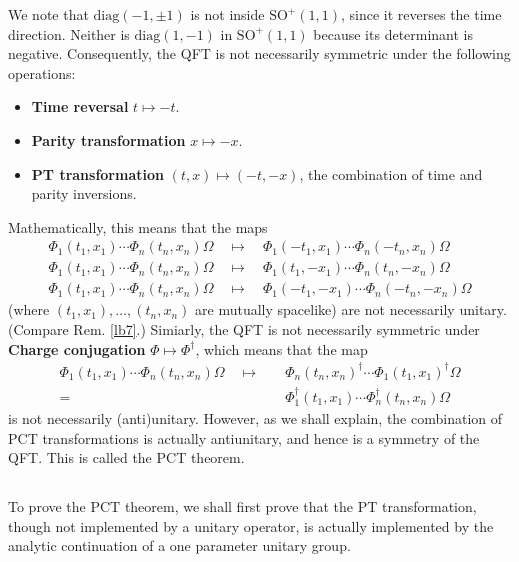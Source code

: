 \documentclass[12pt,b5paper,notitlepage]{article}
\theoremstyle{definition}
\theoremstyle{plain}
\newcommand{\diag}{\mathrm{diag}}
\newcommand{\SO}{\mathrm{SO}}
\numberwithin{equation}{section}
\begin{document}
We note that $\diag(-1,\pm 1)$ is not inside $\SO^+(1,1)$, since it reverses the time direction. Neither is $\diag(1,-1)$ in $\SO^+(1,1)$ because its determinant is negative. Consequently, the QFT is not necessarily symmetric under the following operations:
\begin{itemize}
\item \textbf{{\color{red}T}ime reversal}   $t\mapsto -t$.
\item \textbf{{\color{red}P}arity transformation}  $x\mapsto -x$.
\item \textbf{{\color{red}PT} transformation}  $(t,x)\mapsto (-t,-x)$, the combination of time and parity inversions.
\end{itemize} 
Mathematically, this means that the maps
\begin{gather*}
\Phi_1(t_1,x_1)\cdots \Phi_n(t_n,x_n)\Omega\quad\mapsto\quad \Phi_1(-t_1,x_1)\cdots \Phi_n(-t_n,x_n)\Omega\\
\Phi_1(t_1,x_1)\cdots \Phi_n(t_n,x_n)\Omega\quad\mapsto\quad \Phi_1(t_1,-x_1)\cdots \Phi_n(t_n,-x_n)\Omega\\
\Phi_1(t_1,x_1)\cdots \Phi_n(t_n,x_n)\Omega\quad\mapsto\quad \Phi_1(-t_1,-x_1)\cdots \Phi_n(-t_n,-x_n)\Omega
\end{gather*}
(where $(t_1,x_1),\dots,(t_n,x_n)$ are mutually spacelike) are not necessarily unitary. (Compare Rem. \ref{lb7}.) Simiarly, the QFT is not necessarily symmetric under \textbf{{\color{red}C}harge conjugation} $\Phi\mapsto\Phi^\dagger$, which means that the map
\begin{align*}
\Phi_1(t_1,x_1)\cdots \Phi_n(t_n,x_n)\Omega\quad\mapsto\quad &\Phi_n(t_n,x_n)^\dagger\cdots \Phi_1(t_1,x_1)^\dagger\Omega\\
=&\Phi_1^\dagger(t_1,x_1)\cdots\Phi_n^\dagger(t_n,x_n)\Omega
\end{align*}
is not necessarily (anti)unitary. However, as we shall explain, the combination of PCT transformations is actually antiunitary, and hence is a symmetry of the QFT. This is called the PCT theorem.

\subsection{}


To prove the PCT theorem, we shall first prove that the PT transformation, though not implemented by a unitary operator, is actually implemented by the analytic continuation of a one parameter unitary group.
\end{document}
